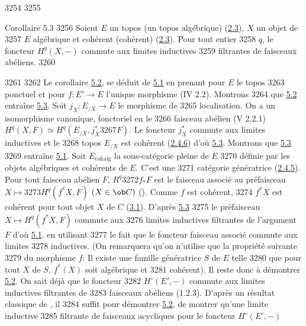   3254	
  3255	\begin{enonce*}{Corollaire 5.3}
  3256	Soient $E$ un topos (\resp un topos algébrique) (\hyperref[VI.def2.3]{2.3}), $X$ un objet de
  3257	$E$ algébrique et cohérent (\resp cohérent) (\hyperref[VI.def2.3]{2.3}). Pour tout entier
  3258	$q$, le foncteur $H^q (X, -)$ commute aux limites inductives
  3259	filtrantes de faisceaux abéliens.
  3260	\end{enonce*}
  3261	
  3262	Le corollaire \hyperref[VI.cor5.2]{5.2}, se déduit de \hyperref[VI.thm5.1]{5.1} en prenant pour $E$ le topos
  3263	ponctuel et pour $f : E'\to E$ l'unique morphisme (IV 2.2). Montrons
  3264	que \hyperref[VI.cor5.2]{5.2} entraîne \hyperref[VI.cor5.3]{5.3}. Soit $j_X : E_{/X} \to E$ le morphisme de
  3265	localisation. On a un isomorphisme canonique, fonctoriel en le
  3266	faisceau abélien (V 2.2.1) $H^q (X, F) \simeq H^q(E_{/X}, j^{\ast}_X
  3267	F)$. Le foncteur $j^{\ast}_X$ commute aux limites inductives et le
  3268	topos $E_{/X}$ est cohérent (\hyperref[VI.subsubsec2.4.6]{2.4.6}) d'où \hyperref[VI.cor5.3]{5.3}. Montrons que \hyperref[VI.cor5.3]{5.3}
  3269	entraîne \hyperref[VI.thm5.1]{5.1}. Soit $E_{\text{cohalg}}$ la sous-catégorie pleine de $E$
  3270	définie par les objets algébriques et cohérents de $E$. C'est une
  3271	catégorie génératrice (\hyperref[VI.subsubsec2.4.5]{2.4.5}). Pour tout faisceau abélien $F$, $R^q
  3272	f_{\ast} F$ est le faisceau associé au préfaisceau $X \mapsto
  3273	H^q(f^{\ast} X, F)$ $(X \in \ob C)$ (). Comme $f$ est cohérent,
  3274	$f^{\ast}X$ est cohérent pour tout objet $X$ de $C$ (\hyperref[VI.def3.1]{3.1}). D'après \hyperref[VI.cor5.3]{5.3}
  3275	le préfaisceau $X \mapsto H^q (f^{\ast} X, F)$ commute aux
  3276	limites inductives filtrantes de l'argument $F$ d'où \hyperref[VI.thm5.1]{5.1}. en utilisant
  3277	le fait que le foncteur faisceau associé commute aux limites
  3278	inductives. (On remarquera qu'on n'utilise que la propriété suivante
  3279	du morphisme $f$: Il existe une famille génératrice $S$ de $E$ telle
  3280	que pour tout $X$ de $S$, $f^{\ast}(X)$ soit algébrique et
  3281	cohérent). Il reste donc à démontrer \hyperref[VI.cor5.2]{5.2}. On sait déjà que le foncteur
  3282	$H^{\circ} (E', -)$ commute aux limites inductives filtrantes de
  3283	faisceaux abéliens (1.2.3). D'après un résultat classique de \cite{7}, il
  3284	suffit pour démontrer \hyperref[VI.cor5.2]{5.2}, de montrer qu'une limite inductive
  3285	filtrante de faisceaux acycliques pour le foncteur $H^{\circ}(E', -)$
